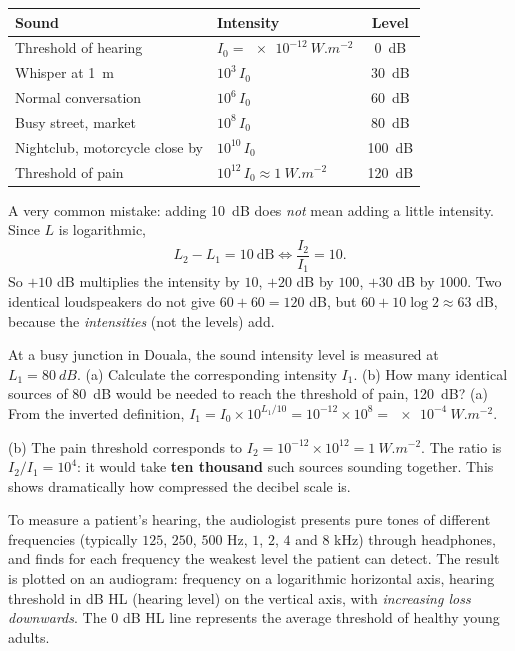 \documentclass[11pt]{article}
\newcommand{\cle}[1]{{\popxbold\color{popdark}#1}}
\newcounter{popsec}
\newcounter{popsub}
\newcommand{\courssub}[1]{%
  \stepcounter{popsub}%
  \par\vspace{9pt}\noindent{\popxbold\fontsize{11.5}{13}\selectfont\color{popink}{\color{poporange}\thepopsec.\thepopsub}\hspace{6pt}#1}\par\nopagebreak\vspace{4pt}
}
\begin{document}
\begin{center}
\begin{tabularx}{\linewidth}{|X|l|c|}
\hline
\rowcolor{popblueL} \textbf{Sound} & \textbf{Intensity} & \textbf{Level} \\
\hline
Threshold of hearing & $I_0 = \SI{e-12}{W.m^{-2}}$ & \SI{0}{dB} \\
\hline
Whisper at \SI{1}{m} & $10^3\,I_0$ & \SI{30}{dB} \\
\hline
Normal conversation & $10^6\,I_0$ & \SI{60}{dB} \\
\hline
Busy street, market & $10^8\,I_0$ & \SI{80}{dB} \\
\hline
Nightclub, motorcycle close by & $10^{10}\,I_0$ & \SI{100}{dB} \\
\hline
Threshold of pain & $10^{12}\,I_0 \approx \SI{1}{W.m^{-2}}$ & \SI{120}{dB} \\
\hline
\end{tabularx}
\end{center}

\begin{attention}
A very common mistake: adding \SI{10}{dB} does \emph{not} mean adding a little intensity. Since $L$ is logarithmic,
\[
L_2 - L_1 = 10\ \mathrm{dB} \iff \frac{I_2}{I_1} = 10 .
\]
So $+10$ dB multiplies the intensity by $10$, $+20$ dB by $100$, $+30$ dB by $1000$. Two identical loudspeakers do not give $60 + 60 = 120$ dB, but $60 + 10\log 2 \approx 63$ dB, because the \emph{intensities} (not the levels) add.
\end{attention}

\begin{exoresolu}
At a busy junction in Douala, the sound intensity level is measured at $L_1 = \SI{80}{dB}$. (a) Calculate the corresponding intensity $I_1$. (b) How many identical sources of \SI{80}{dB} would be needed to reach the threshold of pain, \SI{120}{dB}?
\tcblower
(a) From the inverted definition, $I_1 = I_0 \times 10^{L_1/10} = 10^{-12} \times 10^{8} = \SI{e-4}{W.m^{-2}}$.\par
(b) The pain threshold corresponds to $I_2 = 10^{-12} \times 10^{12} = \SI{1}{W.m^{-2}}$. The ratio is $I_2/I_1 = 10^{4}$: it would take \textbf{ten thousand} such sources sounding together. This shows dramatically how compressed the decibel scale is.
\end{exoresolu}

\courssub{The Audiogram}

To measure a patient's hearing, the audiologist presents pure tones of different frequencies (typically $125$, $250$, $500$ Hz, $1$, $2$, $4$ and $8$ kHz) through headphones, and finds for each frequency the weakest level the patient can detect. The result is plotted on an \cle{audiogram}: frequency on a logarithmic horizontal axis, \cle{hearing threshold} in dB HL (hearing level) on the vertical axis, with \emph{increasing loss downwards}. The $0$ dB HL line represents the average threshold of healthy young adults.
\end{document}
